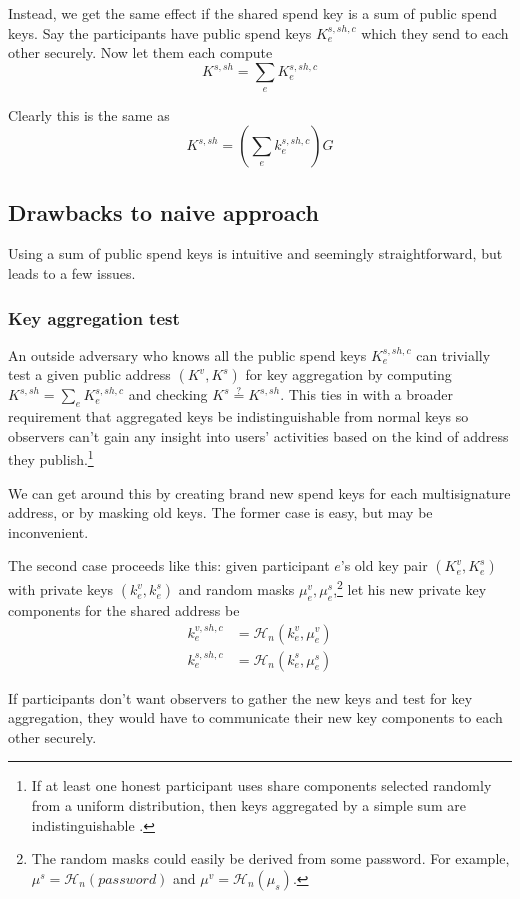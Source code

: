 Instead, we get the same effect if the shared spend key is a sum of public spend keys. Say the participants have public spend keys $K^{s,sh,c}_e$ which they send to each other securely. Now let them each compute
\[ K^{s,sh} = \sum_e K^{s,sh,c}_e \]

Clearly this is the same as 
\[ K^{s,sh} = (\sum_e k^{s,sh,c}_e) G\]

\subsection{Drawbacks to naive approach}
    
Using a sum of public spend keys is intuitive and seemingly straightforward, but leads to a few issues.

\subsubsection*{Key aggregation test}
An outside adversary who knows all the public spend keys $K^{s,sh,c}_e$ can trivially test a given public address $(K^v,K^s)$ for key aggregation by computing $K^{s,sh} = \sum_e K^{s,sh,c}_e$ and checking $K^s \stackrel{?}{=} K^{s,sh}$. This ties in with a broader requirement that aggregated keys be indistinguishable from normal keys so observers can't gain any insight into users' activities based on the kind of address they publish.\footnote{If at least one honest participant uses share components selected randomly from a uniform distribution, then keys aggregated by a simple sum are indistinguishable \cite{SCOZZAFAVA1993313}.}%

We can get around this by creating brand new spend keys for each multisignature address, or by masking old keys. The former case is easy, but may be inconvenient. 

The second case proceeds like this: given participant $e$'s old key pair $(K^v_e,K^s_e)$ with private keys $(k^v_e,k^s_e)$ and random masks $\mu^v_e,\mu^s_e$,\footnote{The random masks could easily be derived from some password. For example, $\mu^s = \mathcal{H}_n(password)$ and $\mu^v = \mathcal{H}_n(\mu_s)$.} let his new private key components for the shared address be
\begin{align*}
    k^{v,sh,c}_e &= \mathcal{H}_n(k^v_e,\mu^v_e)\\
    k^{s,sh,c}_e &= \mathcal{H}_n(k^s_e,\mu^s_e)
\end{align*}

If participants don't want observers to gather the new keys and test for key aggregation, they would have to communicate their new key components to each other securely. 

